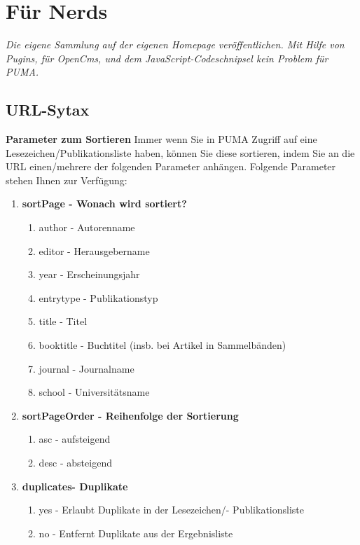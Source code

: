 \section{Für Nerds}
\textit{Die eigene Sammlung auf der eigenen Homepage veröffentlichen. Mit Hilfe von Pugins, für OpenCms,  und dem JavaScript-Codeschnipsel kein Problem für PUMA.}
\subsection{URL-Sytax}
\textbf{Parameter zum Sortieren} \newline
Immer wenn Sie in PUMA Zugriff auf eine Lesezeichen/Publikationsliste haben, können Sie diese sortieren, indem Sie an die URL einen/mehrere der folgenden Parameter anhängen. Folgende Parameter stehen Ihnen zur Verfügung:
\begin{enumerate}
    \item \textbf{sortPage - Wonach wird sortiert?}
    \begin{enumerate}
        \item author - Autorenname
        \item editor - Herausgebername
        \item year - Erscheinungsjahr
        \item entrytype - Publikationstyp
        \item title - Titel
        \item booktitle - Buchtitel (insb. bei Artikel in Sammelbänden)
        \item journal - Journalname
        \item school - Universitätsname 
    \end{enumerate}
    \item \textbf{sortPageOrder - Reihenfolge der Sortierung}
    \begin{enumerate}
        \item asc - aufsteigend
        \item desc - absteigend 
    \end{enumerate}
    \item \textbf{duplicates- Duplikate}
    \begin{enumerate}
        \item yes - Erlaubt Duplikate in der Lesezeichen/- Publikationsliste
        \item no - Entfernt Duplikate aus der Ergebnisliste
    \end{enumerate}
\end{enumerate}
